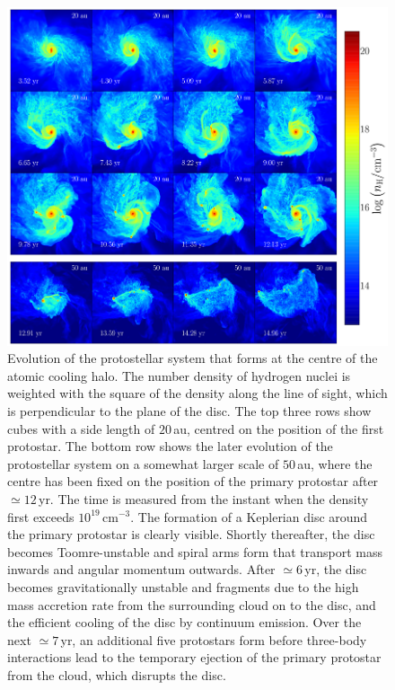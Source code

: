 \documentclass[useAMS,usenatbib]{mnras}
\newcommand{\cmmm}{\text{cm}^{-3}}
\begin{document}
\begin{figure}
\begin{center}
\includegraphics[scale=0.84]{./f7.png}
\caption{Evolution of the protostellar system that forms at the centre of the atomic cooling halo. The number density of hydrogen nuclei is weighted with the square of the density along the line of sight, which is perpendicular to the plane of the disc. The top three rows show cubes with a side length of $20\,$au, centred on the position of the first protostar. The bottom row shows the later evolution of the protostellar system on a somewhat larger scale of $50\,$au, where the centre has been fixed on the position of the primary protostar after $\simeq 12\,$yr. The time is measured from the instant when the density first exceeds $10^{19}\,\cmmm$. The formation of a Keplerian disc around the primary protostar is clearly visible. Shortly thereafter, the disc becomes Toomre-unstable and spiral arms form that transport mass inwards and angular momentum outwards. After $\simeq 6\,$yr, the disc becomes gravitationally unstable and fragments due to the high mass accretion rate from the surrounding cloud on to the disc, and the efficient cooling of the disc by continuum emission. Over the next $\simeq 7\,$yr, an additional five protostars form before three-body interactions lead to the temporary ejection of the primary protostar from the cloud, which disrupts the disc.}
\label{fig:disc}
\end{center}
\end{figure}    
\end{document}
